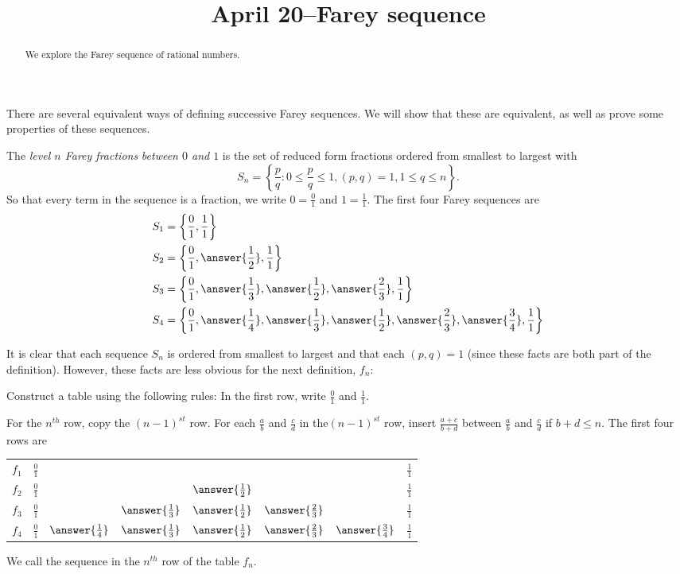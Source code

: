 \documentclass{ximera}
\title{April 20--Farey sequence}
\begin{document}
  
\begin{abstract}  We explore the Farey sequence of rational numbers.
\end{abstract}  
\maketitle  

There are several equivalent ways of defining successive Farey sequences. We will show that these are equivalent, as well as prove some properties of these sequences.

\begin{definition}
 The \emph{level $n$ Farey fractions} \emph{between $0$ and $1$}  is the set of reduced form fractions ordered from smallest to largest with
 \[S_n=\left\{\frac{p}{q}:0\leq \frac{p}{q}\leq 1, (p,q)=1, 1\leq q  \leq n\right\}.\] So that every term in the sequence is a fraction, we write $0=\frac{0}{1}$  and $1=\frac{1}{1}$.  The first four Farey sequences are 
\begin{align*}
 S_1&=\left\{\frac{0}{1},\frac{1}{1}\right\}\\
 S_2&=\left\{\frac{0}{1},\answer{\frac{1}{2}},\frac{1}{1}\right\}\\
 S_3&=\left\{\frac{0}{1},\answer{\frac{1}{3}},\answer{\frac{1}{2}},\answer{\frac{2}{3}},\frac{1}{1}\right\}\\
 S_4&=\left\{\frac{0}{1},\answer{\frac{1}{4}},\answer{\frac{1}{3}},\answer{\frac{1}{2}},\answer{\frac{2}{3}},\answer{\frac{3}{4}},\frac{1}{1}\right\}\\
\end{align*}
\end{definition}
It is clear that each sequence $S_n$ is ordered from smallest to largest and that each $(p,q)=1$ (since these facts are both part of the definition). 
However, these facts are less obvious for the next definition, $f_n$:

\begin{definition}
 Construct a table using the following rules: In the first row, write $\frac{0}{1}$ and $\frac{1}{1}$. 
 
For the $n^{th}$ row, copy the $(n-1)^{st}$ row. For each $\frac{a}{b}$ and $\frac{c}{d}$ in the$(n-1)^{st}$ row, insert $\frac{a+c}{b+d}$ between $\frac{a}{b}$ and $\frac{c}{d}$ if $b+d\leq n$.
The first four rows are 
\begin{tabular}{cccccccc}
$f_1$&$\frac{0}{1}$&&&&&&$\frac{1}{1}$\\
$f_2$&$\frac{0}{1}$&&&$\answer{\frac{1}{2}}$&&&$\frac{1}{1}$ \\
$f_3$&$\frac{0}{1}$&&$\answer{\frac{1}{3}}$&$\answer{\frac{1}{2}}$&$\answer{\frac{2}{3}}$&&$\frac{1}{1}$ \\
$f_4$&$\frac{0}{1}$&$\answer{\frac{1}{4}}$&$\answer{\frac{1}{3}}$&$\answer{\frac{1}{2}}$&$\answer{\frac{2}{3}}$&$\answer{\frac{3}{4}}$&$\frac{1}{1}$
\end{tabular}

We call the sequence in the $n^{th}$ row of the table $f_n$.
\end{definition}
\end{document}
